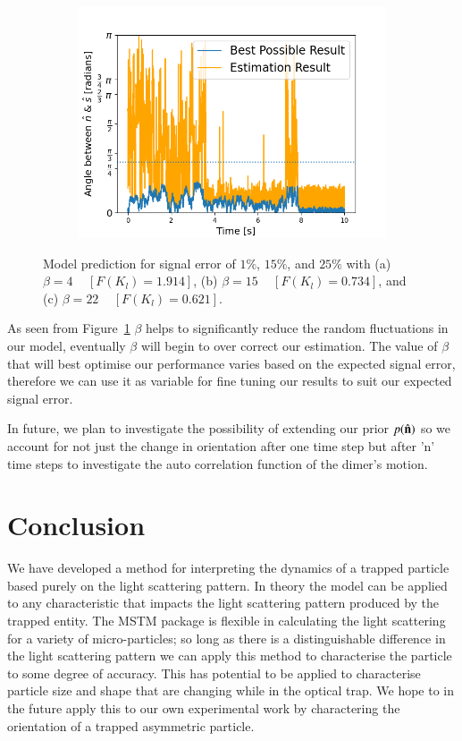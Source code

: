 \documentclass[final,  3p]{elsarticle}
\begin{document}
\begin{figure}[h]
\begin{subfigure}{0.32\textwidth}
	\includegraphics[width=\textwidth]{./Images/fig7c.png}
\end{subfigure}
\caption{\label{fig:beta}
%
  Model prediction for signal error of $1\%$, $15\%$, and $25\%$ with (a) $\beta=4$ ~ $[F(K_l)=1.914]$, (b) $\beta=15$ ~  $[F(K_l)=0.734]$, and (c) $\beta=22$ ~ $[F(K_l)=0.621]$.
%
} 
\end{figure}

As seen from Figure~\ref{fig:beta} $\beta$ helps to significantly
reduce the random fluctuations in our model, eventually $\beta$ will
begin to over correct our estimation.  The value of $\beta$ that will
best optimise our performance varies based on the expected signal
error, therefore we can use it as variable for fine tuning our results
to suit our expected signal error.

In future, we plan to investigate the possibility of extending our
prior $p(\hat{\bf n})$ so we account for not just the change in
orientation after one time step but after 'n' time steps to
investigate the auto correlation function of the dimer's motion.


\section{Conclusion}
\label{sec:Conclusion}

We have developed a method for interpreting the dynamics of a trapped
particle based purely on the light scattering pattern. In theory the
model can be applied to any characteristic that impacts the light
scattering pattern produced by the trapped entity. The MSTM package is
flexible in calculating the light scattering for a variety of
micro-particles; so long as there is a distinguishable difference in
the light scattering pattern we can apply this method to characterise
the particle to some degree of accuracy.  This has potential to be
applied to characterise particle size and shape that are changing
while in the optical trap. We hope to in the future apply this to our
own experimental work by charactering the orientation of a trapped
asymmetric particle.
\end{document}
